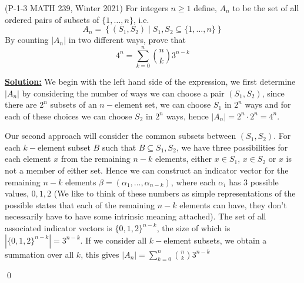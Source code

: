 \documentclass[11pt]{book}
\theoremstyle{definition}
\begin{document}
(P-1-3 MATH 239, Winter 2021) For integers $n \geq 1$ define, $A_n$ to be the set of all ordered pairs of subsets of $\{1,\dots, n\}$, i.e.
$$A_n = \left\{ (S_1,S_2) \mid S_1,S_2 \subseteq \{1,\dots, n\} \right \}$$
By counting $|A_n|$ in two different ways, prove that
$$4^n = \sum_{k = 0}^n \binom{n}{k}3^{n - k}$$

\textbf{\underline{Solution:}} We begin with the left hand side of the expression, we first determine $|A_n|$ by considering the number of ways we can choose a pair $(S_1,S_2)$, since there are $2^n$ subsets of an $n-$element set, we can choose $S_1$ in $2^n$ ways and for each of these choices we can choose $S_2$ in $2^n$ ways, hence $|A_n| = 2^n\cdot 2^n = 4^n$.

Our second approach will consider the common subsets between $(S_1, S_2)$. For each $k-$element subset $B$ such that $B\subseteq S_1,S_2$, we have three possibilities for each element $x$ from the remaining $n-k$ elements, either $x\in S_1$, $x\in S_2$ or $x$ is not a member of either set. Hence we can construct an indicator vector for the remaining $n-k$ elements $\beta = (\alpha_1,\dots,\alpha_{n-k})$, where each $\alpha_i$ has $3$ possible values, $0,1,2$ (We like to think of these numbers as simple representations of the possible states that each of the remaining $n-k$ elements can have, they don't necessarily have to have some intrinsic meaning attached). The set of all associated indicator vectors is $\{0,1,2\}^{n-k}$, the size of which is $|\{0,1,2\}^{n-k}| = 3^{n-k}$. If we consider all $k-$element subsets, we obtain a summation over all $k$, this gives $|A_n| = \sum_{k = 0}^n \binom{n}{k}3^{n -k }$

 \qed
\end{document}
